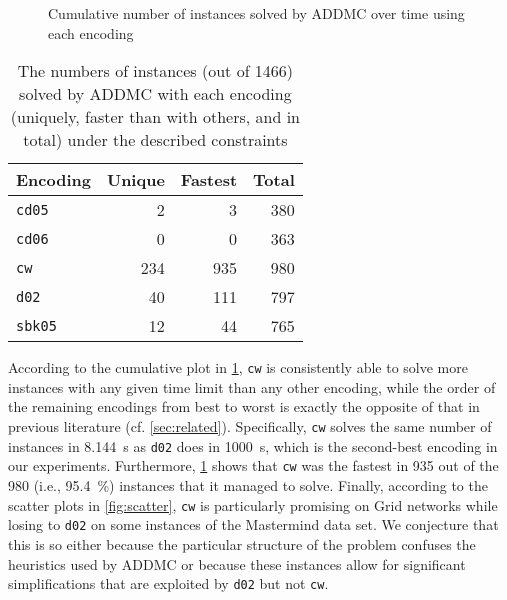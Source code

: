 \documentclass{article}
\begin{document}
\begin{figure}
  \centering
  \caption{Cumulative number of instances solved by ADDMC over time using each
    encoding}
  \label{fig:cumulative}
\end{figure}

\begin{table}
  \centering
  \begin{tabular}{lrrr}
    \toprule
    Encoding & Unique & Fastest & Total \\
    \midrule
    \texttt{cd05} & 2 & 3 & 380 \\
    \texttt{cd06} & 0 & 0 & 363 \\
    \texttt{cw} & 234 & 935 & 980 \\
    \texttt{d02} & 40 & 111 & 797 \\
    \texttt{sbk05} & 12 & 44 & 765 \\
    \bottomrule
  \end{tabular}
  \caption{The numbers of instances (out of 1466) solved by ADDMC with each
    encoding (uniquely, faster than with others, and in total) under the
    described constraints}%
  \label{tbl:tallies}
\end{table}

\begin{figure*}
  \centering
  \caption{ADDMC inference time using \texttt{cw} compared to \texttt{d02}
    (left) and \texttt{sbk05} (right) for each instance in all data sets.}
  \label{fig:scatter}
\end{figure*}

According to the cumulative plot in \cref{fig:cumulative}, \texttt{cw} is
consistently able to solve more instances with any given time limit than any
other encoding, while the order of the remaining encodings from best to worst is
exactly the opposite of that in previous literature (cf. \cref{sec:related}).
Specifically, \texttt{cw} solves the same number of instances in
\SI{8.144}{\second} as \texttt{d02} does in \SI{1000}{\second}, which is the
second-best encoding in our experiments. Furthermore, \cref{tbl:tallies} shows
that \texttt{cw} was the fastest in 935 out of the 980 (i.e.,
\SI{95.4}{\percent}) instances that it managed to solve. Finally, according to
the scatter plots in \cref{fig:scatter}, \texttt{cw} is particularly promising
on Grid networks while losing to \texttt{d02} on some instances of the
Mastermind data set. We conjecture that this is so either because the particular
structure of the problem confuses the heuristics used by ADDMC or because these
instances allow for significant simplifications that are exploited by
\texttt{d02} but not \texttt{cw}.
\end{document}
